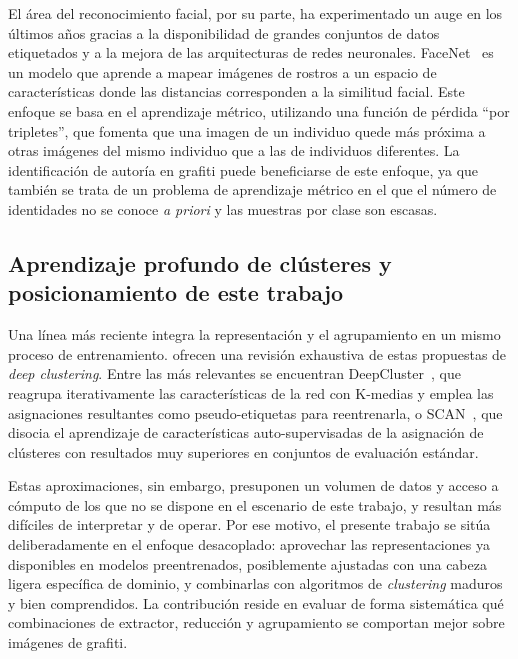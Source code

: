 El área del reconocimiento facial, por su parte, ha experimentado un auge en
los últimos años gracias a la disponibilidad de grandes conjuntos de datos
etiquetados y a la mejora de las arquitecturas de redes neuronales.
FaceNet~\cite{schroff_facenet_2015} es un modelo que aprende a mapear imágenes
de rostros a un espacio de características donde las distancias corresponden a
la similitud facial. Este enfoque se basa en el aprendizaje métrico, utilizando
una función de pérdida \enquote{por tripletes}, que fomenta que una imagen de
un individuo quede más próxima a otras imágenes del mismo individuo que a las
de individuos diferentes. La identificación de autoría en grafiti puede
beneficiarse de este enfoque, ya que también se trata de un problema de
aprendizaje métrico en el que el número de identidades no se conoce \textit{a
priori} y las muestras por clase son escasas.

\subsection{Aprendizaje profundo de clústeres y posicionamiento de
este trabajo}
\label{subsec:art-deep-clustering}

Una línea más reciente integra la representación y el agrupamiento en un mismo
proceso de entrenamiento.  ofrecen una
revisión exhaustiva de estas propuestas de \textit{deep clustering}. Entre las
más relevantes se encuentran DeepCluster~\cite{caron_deep_2019}, que reagrupa
iterativamente las características de la red con K-medias y emplea las
asignaciones resultantes como pseudo-etiquetas para reentrenarla, o
SCAN~\cite{van_gansbeke_scan_2020}, que disocia el aprendizaje de
características auto-supervisadas de la asignación de clústeres con resultados
muy superiores en conjuntos de evaluación estándar.

Estas aproximaciones, sin embargo, presuponen un volumen de datos y acceso a
cómputo de los que no se dispone en el escenario de este trabajo, y resultan
más difíciles de interpretar y de operar. Por ese motivo, el presente trabajo
se sitúa deliberadamente en el enfoque desacoplado: aprovechar las
representaciones ya disponibles en modelos preentrenados, posiblemente
ajustadas con una cabeza ligera específica de dominio, y combinarlas con
algoritmos de \textit{clustering} maduros y bien comprendidos. La contribución
reside en evaluar de forma sistemática qué combinaciones de extractor,
reducción y agrupamiento se comportan mejor sobre imágenes de grafiti.

